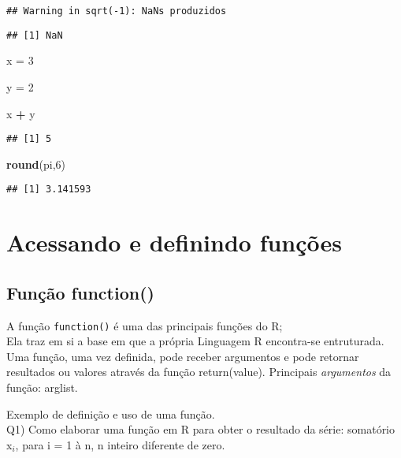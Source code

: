 \documentclass[]{article}
\newenvironment{Shaded}{\begin{snugshade}}{\end{snugshade}}
\newcommand{\KeywordTok}[1]{\textcolor[rgb]{0.13,0.29,0.53}{\textbf{#1}}}
\newcommand{\DecValTok}[1]{\textcolor[rgb]{0.00,0.00,0.81}{#1}}
\newcommand{\StringTok}[1]{\textcolor[rgb]{0.31,0.60,0.02}{#1}}
\newcommand{\OperatorTok}[1]{\textcolor[rgb]{0.81,0.36,0.00}{\textbf{#1}}}
\newcommand{\NormalTok}[1]{#1}
\begin{document}
\begin{verbatim}
## Warning in sqrt(-1): NaNs produzidos
\end{verbatim}

\begin{verbatim}
## [1] NaN
\end{verbatim}

\begin{Shaded}
\begin{Highlighting}[]
\NormalTok{x =}\StringTok{ }\DecValTok{3}

\NormalTok{y =}\StringTok{ }\DecValTok{2}

\NormalTok{x }\OperatorTok{+}\StringTok{ }\NormalTok{y}
\end{Highlighting}
\end{Shaded}

\begin{verbatim}
## [1] 5
\end{verbatim}

\begin{Shaded}
\begin{Highlighting}[]
\KeywordTok{round}\NormalTok{(pi,}\DecValTok{6}\NormalTok{)}
\end{Highlighting}
\end{Shaded}

\begin{verbatim}
## [1] 3.141593
\end{verbatim}

\section{Acessando e definindo
funções}\label{acessando-e-definindo-funcoes}

\subsection{Função function()}\label{funcao-function}

A função \texttt{function()} é uma das principais funções do R;\\
Ela traz em si a base em que a própria Linguagem R encontra-se
entruturada. Uma função, uma vez definida, pode receber argumentos e
pode retornar resultados ou valores através da função return(value).
Principais \emph{argumentos} da função: arglist.

Exemplo de definição e uso de uma função.\\
Q1) Como elaborar uma função em R para obter o resultado da série:
somatório x\({_{i}}\), para i = 1 à n, n inteiro diferente de zero.
\end{document}
